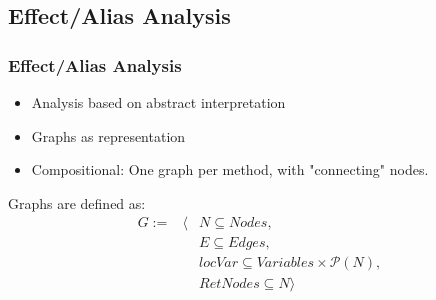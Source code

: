 \documentclass[hyperref={pdfpagelabels=false}]{beamer}
\begin{document}
\subsection{Effect/Alias Analysis}
\begin{frame}
    \frametitle{Effect/Alias Analysis}
    \begin{itemize}
        \item Analysis based on abstract interpretation
        \item Graphs as representation
        \item Compositional: One graph per method, with "connecting" nodes.
    \end{itemize}

    Graphs are defined as:
    \begin{eqnarray*}
        G           := &\langle& N \subseteq Nodes, \\
                       && E \subseteq Edges, \\
                       && locVar \subseteq Variables \times \mathcal{P}(N), \\
                       && RetNodes \subseteq N \rangle \\
    \end{eqnarray*}
\end{frame}
\end{document}
